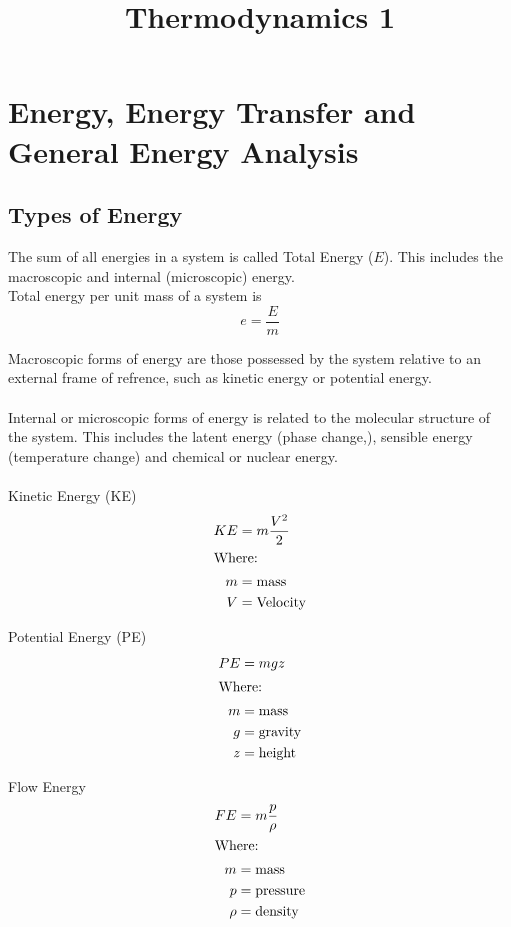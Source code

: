 \documentclass[12pt,a4paper]{article}
\begin{document}
\title{Thermodynamics 1}
\date{}
\maketitle

\newpage

\tableofcontents

\newpage

\section{Energy, Energy Transfer and General Energy Analysis}
    \subsection{Types of Energy}
        The sum of all energies in a system is called Total Energy ($E$). This includes the macroscopic and internal (microscopic) energy. \\
        Total energy per unit mass of a system is
        \[e=\frac{E}{m}\]

        Macroscopic forms of energy are those possessed by the system relative to an external frame of refrence, such as kinetic energy or potential energy. \\
        \\
        Internal or microscopic forms of energy is related to the molecular structure of the system. This includes the latent energy (phase change,), sensible energy (temperature change) and chemical or nuclear energy. \\
        \\
        Kinetic Energy (KE)
        \begin{align*}
            KE&=m\frac{V^2}{2} \\
            \intertext{Where:}
            m &= \text{mass}  \\
            V&=\text{Velocity} 
        \end{align*}

        Potential Energy (PE)
        \begin{align*}
            PE&=mgz \\
            \intertext{Where:}
            m&=\text{mass}  \\
            g&=\text{gravity}  \\
            z&=\text{height}  
        \end{align*}

        Flow Energy
        \begin{align*}
            FE &=m\frac{p}{\rho} \\
            \intertext{Where: }
            m&=\text{mass}  \\
            p&=\text{pressure}  \\
            \rho&=\text{density} 
        \end{align*}
\end{document}

